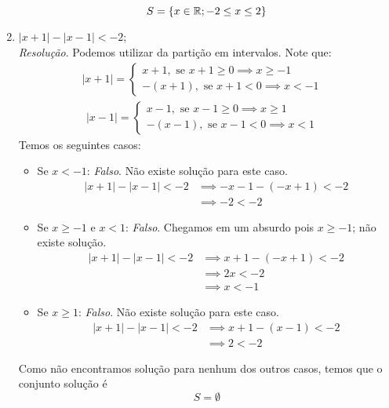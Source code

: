\begin{enumerate}
\begin{displaymath}
        S = \{x \in \mathbb R; -2 \le x \le 2 \}
    \end{displaymath}
    \item $|x + 1| - |x - 1| < -2$;
    \\ \emph{Resolução}.
    Podemos utilizar da partição em intervalos. Note que:
    \begin{align*}
        |x + 1| = \left\{ \begin{array}{cc}
             x + 1, \text{ se } x + 1 \ge 0 \implies x \ge -1&  \\
             -( x + 1), \text{ se } x + 1 < 0 \implies x < -1&
        \end{array}\right.
    \end{align*}
    \begin{align*}
        |x - 1| = \left\{ \begin{array}{cc}
             x - 1, \text{ se } x - 1 \ge 0 \implies x \ge 1&  \\
             -( x - 1), \text{ se } x - 1 < 0 \implies x < 1& 
        \end{array}\right.
    \end{align*}
    Temos os seguintes casos: 
    \begin{itemize}
        \item Se $x < -1$: \emph{Falso}. Não existe solução para este caso.
        \begin{align*}
            |x + 1| - |x - 1| < -2 & \implies
            -x-1 - (-x + 1) < -2 \\ & \implies
            -2 < -2
        \end{align*}
        \item Se $x \ge -1 \text{ e } x < 1$: \emph{Falso}. Chegamos em um absurdo pois $x \ge -1$; não existe solução.
        \begin{align*}
            |x + 1| - |x - 1| < -2 & \implies
            x + 1 - (-x + 1) < -2 \\ & \implies
            2x < -2 \\ & \implies x < -1
        \end{align*}
        \item Se $x \ge 1$: \emph{Falso}. Não existe solução para este caso.
        \begin{align*}
            |x + 1| - |x - 1| < -2 & \implies x + 1 - (x - 1) < -2 \\ & \implies
            2 < -2
        \end{align*}
    \end{itemize}
    Como não encontramos solução para nenhum dos outros casos, temos que o conjunto solução é
    \begin{displaymath}
        S = \emptyset
    \end{displaymath}
\end{enumerate}